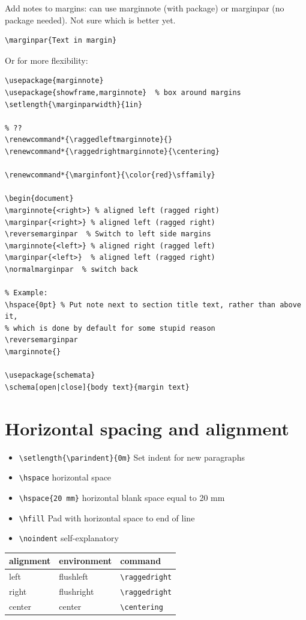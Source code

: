 \documentclass{article}
\begin{document}
Add notes to margins: can use marginnote (with package) or marginpar
(no package needed). Not sure which is better yet.
\begin{lstlisting}
\marginpar{Text in margin}
\end{lstlisting}
Or for more flexibility:
\begin{lstlisting}
\usepackage{marginnote}
\usepackage{showframe,marginnote}  % box around margins
\setlength{\marginparwidth}{1in}

% ??
\renewcommand*{\raggedleftmarginnote}{}
\renewcommand*{\raggedrightmarginnote}{\centering}

\renewcommand*{\marginfont}{\color{red}\sffamily}

\begin{document}
\marginnote{<right>} % aligned left (ragged right)
\marginpar{<right>} % aligned left (ragged right)
\reversemarginpar  % Switch to left side margins
\marginnote{<left>} % aligned right (ragged left)
\marginpar{<left>}  % aligned left (ragged right)
\normalmarginpar  % switch back

% Example:
\hspace{0pt} % Put note next to section title text, rather than above it,
% which is done by default for some stupid reason
\reversemarginpar
\marginnote{}

\usepackage{schemata}
\schema[open|close]{body text}{margin text}
\end{lstlisting}


\section{Horizontal spacing and alignment}
\begin{itemize}
    \item \verb|\setlength{\parindent}{0m}| Set indent for new paragraphs
    \item \verb|\hspace| horizontal space
    \item \verb|\hspace{20 mm}| horizontal blank space equal to 20 mm
    \item \verb|\hfill| Pad with horizontal space to end of line
    \item \verb|\noindent| self-explanatory
\end{itemize}

\begin{tabular}{l l l}
    alignment & environment & command\\
    \hline
    left & flushleft & \verb|\raggedright|\\
    right & flushright & \verb|\raggedright|\\
    center & center & \verb|\centering|\\
\end{tabular}
\end{document}
